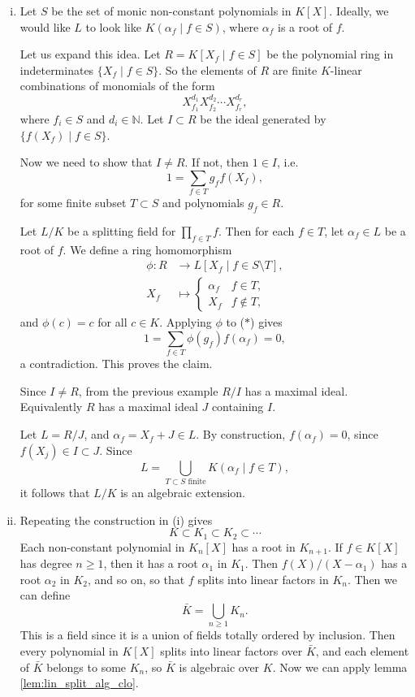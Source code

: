\documentclass[12pt]{article}
\begin{document}
\begin{proofbox}


	\begin{enumerate}[(i)]
		\item Let $S$ be the set of monic non-constant polynomials in $K[X]$. Ideally, we would like $L$ to look like $K(\alpha_f \mid f\in S)$, where $\alpha_f$ is a root of $f$.

			Let us expand this idea. Let $R = K[X_f \mid f \in S]$ be the polynomial ring in indeterminates $\{X_f \mid f \in S\}$. So the elements of $R$ are finite $K$-linear combinations of monomials of the form
			\[
			X_{f_1}^{d_1} X_{f_2}^{d_2} \cdots X_{f_r}^{d_r},
			\]
			where $f_i \in S$ and $d_i \in \mathbb{N}$. Let $I \subset R$ be the ideal generated by $\{f(X_f) \mid f \in S\}$.

			Now we need to show that $I \neq R$. If not, then $1 \in I$, i.e.
			\[
				1 = \sum_{f \in T} g_f f(X_f), \tag{$\ast$}
			\]
			for some finite subset $T \subset S$ and polynomials $g_f \in R$.

			Let $L/K$ be a splitting field for $\prod_{f \in T} f$. Then for each $f \in T$, let $\alpha_f \in L$ be a root of $f$. We define a ring homomorphism
			\begin{align*}
				\phi : R &\to L[X_f \mid f \in S \setminus T], \\
				X_f &\mapsto
				\begin{cases}
					\alpha_f & f \in T, \\
					X_f & f \not \in T,
				\end{cases}
			\end{align*}
			and $\phi(c) = c$ for all $c \in K$. Applying $\phi$ to ($\ast$) gives
			\[
				1 = \sum_{f \in T} \phi(g_f) f(\alpha_f) = 0,
			\]
			a contradiction. This proves the claim.

			Since $I \neq R$, from the previous example $R/I$ has a maximal ideal. Equivalently $R$ has a maximal ideal $J$ containing $I$.

			Let $L=  R/J$, and $\alpha_f = X_f + J \in L$. By construction, $f(\alpha_f) = 0$, since $f(X_j) \in I \subset J$. Since
			\[
				L = \bigcup_{T \subset S \text{ finite}} K(\alpha_f \mid f \in T),
			\]
			it follows that $L/K$ is an algebraic extension.
		\item Repeating the construction in (i) gives
			\[
			K \subset K_1 \subset K_2 \subset \cdots
			\]
			Each non-constant polynomial in $K_n[X]$ has a root in $K_{n+1}$. If $f \in K[X]$ has degree $n \geq 1$, then it has a root $\alpha_1$ in $K_1$. Then $f(X)/(X-\alpha_1)$ has a root $\alpha_2$ in $K_2$, and so on, so that $f$ splits into linear factors in $K_n$. Then we can define
			\[
			\bar K = \bigcup_{n \geq 1} K_n.
			\]
			This is a field since it is a union of fields totally ordered by inclusion. Then every polynomial in $K[X]$ splits into linear factors over $\bar K$, and each element of $\bar K$ belongs to some $K_n$, so $\bar K$ is algebraic over $K$. Now we can apply lemma \ref{lem:lin_split_alg_clo}.
	\end{enumerate}
\end{proofbox}
\end{document}
